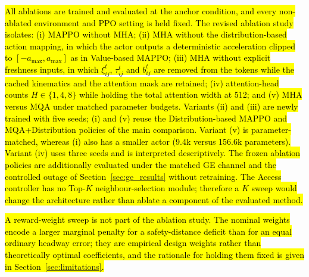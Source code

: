 \documentclass{ieeeaccess}
\begin{document}
\hl{All ablations are trained and evaluated at the anchor condition, and every non-ablated environment and PPO setting is held fixed. The revised ablation study isolates: (i) MAPPO without MHA; (ii) MHA without the distribution-based action mapping, in which the actor outputs a deterministic acceleration clipped to $[-a_{\max},a_{\max}]$ as in Value-based MAPPO; (iii) MHA without explicit freshness inputs, in which $\xi_{ij}^t$, $\tau_{ij}^t$ and $b_{ij}^t$ are removed from the tokens while the cached kinematics and the attention mask are retained; (iv) attention-head counts $H\in\{1,4,8\}$ while holding the total attention width at 512; and (v) MHA versus MQA under matched parameter budgets. Variants (ii) and (iii) are newly trained with five seeds; (i) and (v) reuse the Distribution-based MAPPO and MQA+Distribution policies of the main comparison. Variant (v) is parameter-matched, whereas (i) also has a smaller actor (9.4k versus 156.6k parameters). Variant (iv) uses three seeds and is interpreted descriptively. The frozen ablation policies are additionally evaluated under the matched GE channel and the controlled outage of Section~\ref{sec:ge_results} without retraining. The Access controller has no Top-$K$ neighbour-selection module; therefore a $K$ sweep would change the architecture rather than ablate a component of the evaluated method.} %

\hl{A reward-weight sweep is not part of the ablation study. The nominal weights encode a larger marginal penalty for a safety-distance deficit than for an equal ordinary headway error; they are empirical design weights rather than theoretically optimal coefficients, and the rationale for holding them fixed is given in Section~\ref{sec:limitations}.}
\end{document}
